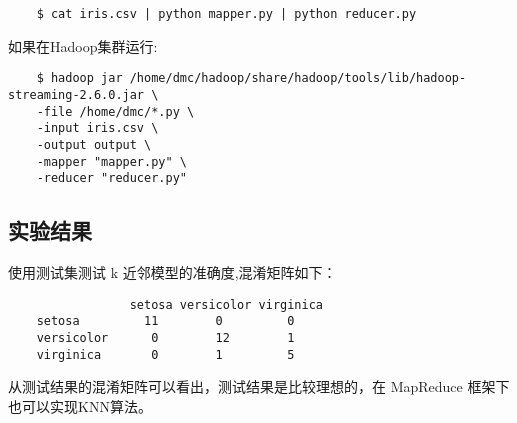 \begin{lstlisting}
	$ cat iris.csv | python mapper.py | python reducer.py
\end{lstlisting}
如果在Hadoop集群运行:

\begin{lstlisting}
	$ hadoop jar /home/dmc/hadoop/share/hadoop/tools/lib/hadoop-streaming-2.6.0.jar \
	-file /home/dmc/*.py \
	-input iris.csv \
	-output output \
	-mapper "mapper.py" \
	-reducer "reducer.py"
\end{lstlisting}

\subsection{实验结果}\label{ux5b9eux9a8cux7ed3ux679c}



使用测试集测试 k 近邻模型的准确度,混淆矩阵如下：

\begin{lstlisting}
	             setosa versicolor virginica
	setosa         11        0         0
	versicolor      0        12        1
	virginica       0        1         5
\end{lstlisting}

{\color{red}从测试结果的混淆矩阵可以看出，测试结果是比较理想的，在 MapReduce 框架下也可以实现KNN算法。}
